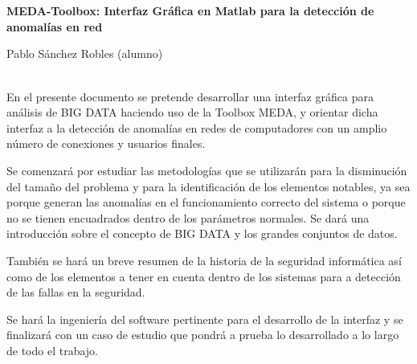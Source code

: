\chapter*{}


%



\thispagestyle{empty}

\begin{center}
{\large\bfseries  MEDA-Toolbox: Interfaz Gráfica en Matlab para la detección de anomalías en red}\\
\end{center}
\begin{center}
Pablo Sánchez Robles  (alumno)\\
\end{center}


\vspace{0.7cm}
\\

En el presente documento se pretende desarrollar una interfaz gráfica para análisis de BIG DATA haciendo uso de la Toolbox MEDA, y orientar dicha interfaz a la detección de anomalías en redes de computadores con un amplio número de conexiones y usuarios finales.
\bigskip

Se comenzará por estudiar las metodologías que se utilizarán para la disminución del tamaño del problema y para la identificación de los elementos notables, ya sea porque generan las anomalías en el funcionamiento correcto del sistema o porque no se tienen encuadrados dentro de los parámetros normales. Se dará una introducción sobre el concepto de BIG DATA y los grandes conjuntos de datos.
\bigskip

También se hará un breve resumen de la historia de la seguridad informática así como de los elementos a tener en cuenta dentro de los sistemas para a detección de las fallas en la seguridad.
\bigskip

Se hará la ingeniería del software pertinente para el desarrollo de la interfaz y se finalizará con un caso de estudio que pondrá a prueba lo desarrollado a lo largo de todo el trabajo.


